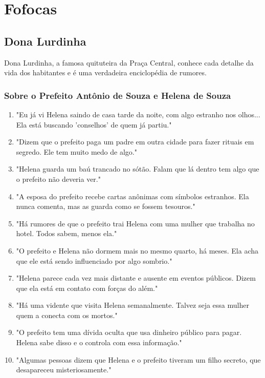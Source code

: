 \chapter{Fofocas}

\section{Dona Lurdinha}
Dona Lurdinha, a famosa quituteira da Praça Central, conhece cada detalhe da vida dos habitantes e é uma verdadeira enciclopédia de rumores.

\subsection*{Sobre o Prefeito Antônio de Souza e Helena de Souza}
\begin{enumerate}
    \item "Eu já vi Helena saindo de casa tarde da noite, com algo estranho nos olhos... Ela está buscando 'conselhos' de quem já partiu."
    \item "Dizem que o prefeito paga um padre em outra cidade para fazer rituais em segredo. Ele tem muito medo de algo."
    \item "Helena guarda um baú trancado no sótão. Falam que lá dentro tem algo que o prefeito não deveria ver."
    \item "A esposa do prefeito recebe cartas anônimas com símbolos estranhos. Ela nunca comenta, mas as guarda como se fossem tesouros."
    \item "Há rumores de que o prefeito trai Helena com uma mulher que trabalha no hotel. Todos sabem, menos ela."
    \item "O prefeito e Helena não dormem mais no mesmo quarto, há meses. Ela acha que ele está sendo influenciado por algo sombrio."
    \item "Helena parece cada vez mais distante e ausente em eventos públicos. Dizem que ela está em contato com forças do além."
    \item "Há uma vidente que visita Helena semanalmente. Talvez seja essa mulher quem a conecta com os mortos."
    \item "O prefeito tem uma dívida oculta que usa dinheiro público para pagar. Helena sabe disso e o controla com essa informação."
    \item "Algumas pessoas dizem que Helena e o prefeito tiveram um filho secreto, que desapareceu misteriosamente."

\end{enumerate}

